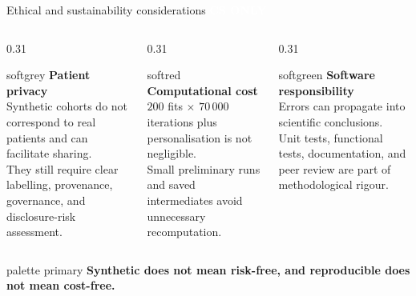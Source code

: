 \documentclass{beamer}
\newcommand{\CSonly}{\colorbox{CSred}{\textcolor{white}{\scriptsize\bfseries CS ONLY}}}
\newcommand{\takeaway}[1]{%
  \begin{beamercolorbox}[rounded=true,sep=0.7ex,wd=\linewidth]{palette primary}
    \centering\bfseries #1
  \end{beamercolorbox}}
\newcommand{\softbox}[2]{%
  \begin{beamercolorbox}[rounded=true,sep=0.8ex,wd=\linewidth]{#1}#2\end{beamercolorbox}}
\begin{document}
\begin{frame}{Ethical and sustainability considerations \hfill \CSonly}
  \begin{columns}[T,onlytextwidth]
    \begin{column}{0.31\textwidth}
      \softbox{softgrey}{
        \centering\textbf{Patient privacy}\\[0.45em]
        \small Synthetic cohorts do not correspond to real patients and can facilitate sharing.\\[0.45em]
        They still require clear labelling, provenance, governance, and disclosure-risk assessment.
      }
    \end{column}
    \begin{column}{0.31\textwidth}
      \softbox{softred}{
        \centering\textbf{Computational cost}\\[0.45em]
        \small $200$ fits $\times$ $70\,000$ iterations plus personalisation is not negligible.\\[0.45em]
        Small preliminary runs and saved intermediates avoid unnecessary recomputation.
      }
    \end{column}
    \begin{column}{0.31\textwidth}
      \softbox{softgreen}{
        \centering\textbf{Software responsibility}\\[0.45em]
        \small Errors can propagate into scientific conclusions.\\[0.45em]
        Unit tests, functional tests, documentation, and peer review are part of methodological rigour.
      }
    \end{column}
  \end{columns}

  \vfill
  \takeaway{Synthetic does not mean risk-free, and reproducible does not mean cost-free.}
\end{frame}
\end{document}
